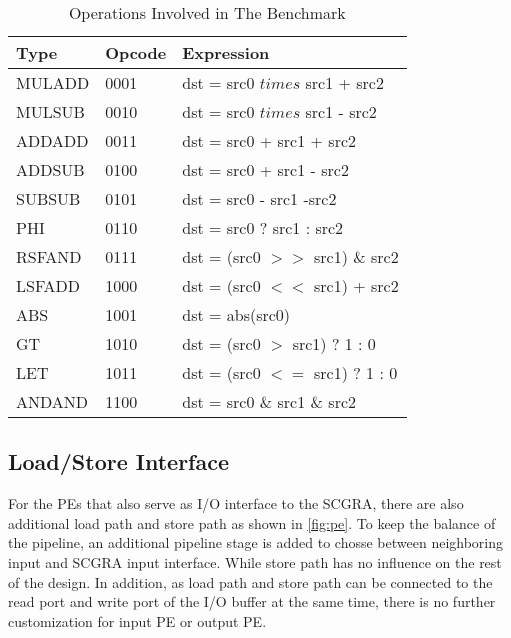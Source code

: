 \begin{table}[h]
\caption{Operations Involved in The Benchmark}
\label{tab:operations}
\centering
\begin{tabular}{|p{1.5cm}|p{1.5cm}|p{4cm}|}
\hline
Type & Opcode & Expression \\

\hline
MULADD & 0001 & {dst = src0 $times$ src1 + src2} \\

\hline
MULSUB & 0010 & {dst = src0 $times$ src1 - src2} \\

\hline
ADDADD & 0011 & {dst = src0 + src1 + src2} \\

\hline
ADDSUB & 0100 & {dst = src0 + src1 - src2} \\

\hline
SUBSUB & 0101 & {dst = src0 - src1 -src2} \\

\hline 
PHI & 0110 & {dst = src0 ? src1 : src2} \\

\hline
RSFAND & 0111 & {dst = (src0 $>>$ src1) \& src2} \\

\hline
LSFADD & 1000 & {dst = (src0 $<<$ src1) + src2} \\

\hline
ABS & 1001 & {dst = abs(src0)} \\

\hline
GT & 1010 & {dst = (src0 $>$ src1) ? 1 : 0} \\

\hline
LET & 1011 & {dst = (src0 $<=$ src1) ? 1 : 0} \\

\hline
ANDAND & 1100 & {dst = src0 \& src1 \& src2} \\

\hline
\end{tabular}
\end{table}

\subsection{Load/Store Interface}
For the PEs that also serve as I/O interface to the SCGRA, there are also additional load path and store path as shown in \ref{fig:pe}. To keep the balance of the pipeline, an additional pipeline stage is added to chosse between neighboring input and SCGRA input interface. While store path has no influence on the rest of the design. In addition, as load path and store path can be connected to the read port and write port of the I/O buffer at the same time, there is no further customization for input PE or output PE. 

